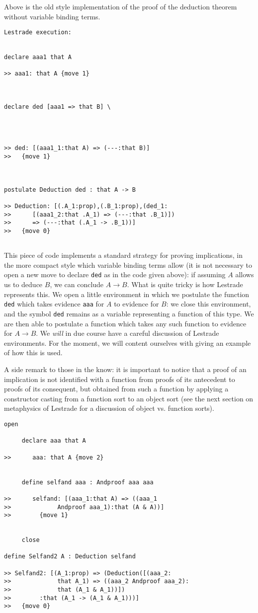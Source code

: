 \documentclass[12pt]{article}
\begin{document}
Above is the old style implementation of the proof of the deduction theorem without variable binding terms.

\begin{verbatim}Lestrade execution:


declare aaa1 that A

>> aaa1: that A {move 1}



declare ded [aaa1 => that B] \
   



>> ded: [(aaa1_1:that A) => (---:that B)]
>>   {move 1}



postulate Deduction ded : that A -> B

>> Deduction: [(.A_1:prop),(.B_1:prop),(ded_1:
>>      [(aaa1_2:that .A_1) => (---:that .B_1)])
>>      => (---:that (.A_1 -> .B_1))]
>>   {move 0}


\end{verbatim}


This piece of code implements a standard strategy for proving implications, in the more compact style which variable binding terms allow (it is not necessary to open a new move to declare {\tt ded} as in the code given above):  if assuming $A$ allows us to deduce $B$, we can conclude $A \rightarrow B$.  What is quite tricky is how Lestrade represents this.  We open a little environment in which we postulate the function {\tt ded} which takes 
evidence {\tt aaa} for $A$ to evidence for $B$:  we close this environment, and the symbol {\tt ded} remains as a variable representing a function of this type.  We are then able to postulate a function which takes any such function to evidence for $A \rightarrow B$.  We {\em will\/} in due course have a careful discussion of Lestrade environments.  For the moment, we will content ourselves with giving an example of how this is used.

A side remark to those in the know:  it is important to notice that a proof of an implication is not identified with a function from proofs of its antecedent to proofs of its consequent, but obtained from such a function by applying a constructor casting from a function sort to an object sort (see the next section on metaphysics of Lestrade for a discussion of object vs. function sorts).

   \begin{verbatim}
open

     declare aaa that A

>>      aaa: that A {move 2}


     define selfand aaa : Andproof aaa aaa

>>      selfand: [(aaa_1:that A) => ((aaa_1 
>>             Andproof aaa_1):that (A & A))]
>>        {move 1}


     close

define Selfand2 A : Deduction selfand

>> Selfand2: [(A_1:prop) => (Deduction([(aaa_2:
>>             that A_1) => ((aaa_2 Andproof aaa_2):
>>             that (A_1 & A_1))])
>>        :that (A_1 -> (A_1 & A_1)))]
>>   {move 0}

\end{verbatim}
\end{document}
